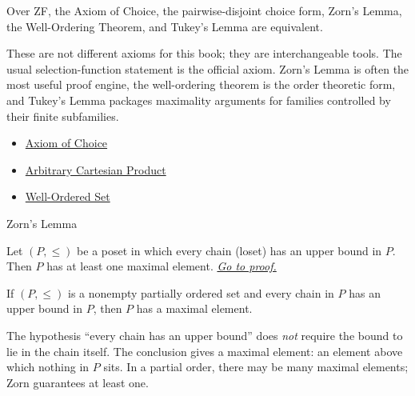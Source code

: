 \begin{remark*}
Over ZF, the Axiom of Choice, the pairwise-disjoint choice form, Zorn's
Lemma, the Well-Ordering Theorem, and Tukey's Lemma are equivalent.
\end{remark*}

\begin{remark*}[Interpretation]
These are not different axioms for this book; they are interchangeable tools.
The usual selection-function statement is the official axiom. Zorn's Lemma is
often the most useful proof engine, the well-ordering theorem is the order
theoretic form, and Tukey's Lemma packages maximality arguments for families
controlled by their finite subfamilies.
\end{remark*}

\begin{dependencies}
\begin{itemize}
  \item \hyperref[ax:choice]{Axiom of Choice}
  \item \hyperref[def:arbitrary-product]{Arbitrary Cartesian Product}
  \item \hyperref[def:well-ordered-set]{Well-Ordered Set}
\end{itemize}
\end{dependencies}

\begin{theorembox}{Zorn's Lemma}
\begin{theorem}
\label{thm:zorn}
Let $(P, \leq)$ be a poset in which every chain (loset) has an upper bound
in $P$. Then $P$ has at least one maximal element.
\hyperref[prf:zorn]{\textit{Go to proof.}}
\end{theorem}
\end{theorembox}

\begin{remark*}
If $(P,\leq)$ is a nonempty partially ordered set and every chain in $P$ has
an upper bound in $P$, then $P$ has a maximal element.
\end{remark*}

\begin{remark*}[Interpretation]
The hypothesis ``every chain has an upper bound'' does \emph{not} require
the bound to lie in the chain itself. The conclusion gives a maximal
element: an element above which nothing in $P$ sits. In a partial order,
there may be many maximal elements; Zorn guarantees at least one.
\end{remark*}

